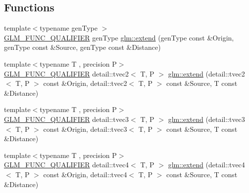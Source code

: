 \subsection*{Functions}
\begin{DoxyCompactItemize}
\item 
{\footnotesize template$<$typename gen\+Type $>$ }\\\hyperlink{setup_8hpp_a33fdea6f91c5f834105f7415e2a64407}{G\+L\+M\+\_\+\+F\+U\+N\+C\+\_\+\+Q\+U\+A\+L\+I\+F\+I\+ER} gen\+Type \hyperlink{namespaceglm_a88c4890406fab3280de470ce780e6b9d}{glm\+::extend} (gen\+Type const \&Origin, gen\+Type const \&Source, gen\+Type const \&Distance)
\item 
{\footnotesize template$<$typename T , precision P$>$ }\\\hyperlink{setup_8hpp_a33fdea6f91c5f834105f7415e2a64407}{G\+L\+M\+\_\+\+F\+U\+N\+C\+\_\+\+Q\+U\+A\+L\+I\+F\+I\+ER} detail\+::tvec2$<$ T, P $>$ \hyperlink{namespaceglm_ac0149acd341de18dc0d0e96e02438d08}{glm\+::extend} (detail\+::tvec2$<$ T, P $>$ const \&Origin, detail\+::tvec2$<$ T, P $>$ const \&Source, T const \&Distance)
\item 
{\footnotesize template$<$typename T , precision P$>$ }\\\hyperlink{setup_8hpp_a33fdea6f91c5f834105f7415e2a64407}{G\+L\+M\+\_\+\+F\+U\+N\+C\+\_\+\+Q\+U\+A\+L\+I\+F\+I\+ER} detail\+::tvec3$<$ T, P $>$ \hyperlink{namespaceglm_ac6db537bc391ad6631e114ac3ce2fde8}{glm\+::extend} (detail\+::tvec3$<$ T, P $>$ const \&Origin, detail\+::tvec3$<$ T, P $>$ const \&Source, T const \&Distance)
\item 
{\footnotesize template$<$typename T , precision P$>$ }\\\hyperlink{setup_8hpp_a33fdea6f91c5f834105f7415e2a64407}{G\+L\+M\+\_\+\+F\+U\+N\+C\+\_\+\+Q\+U\+A\+L\+I\+F\+I\+ER} detail\+::tvec4$<$ T, P $>$ \hyperlink{namespaceglm_a0d81de9b541fb273f3009b26e26e944e}{glm\+::extend} (detail\+::tvec4$<$ T, P $>$ const \&Origin, detail\+::tvec4$<$ T, P $>$ const \&Source, T const \&Distance)
\end{DoxyCompactItemize}
